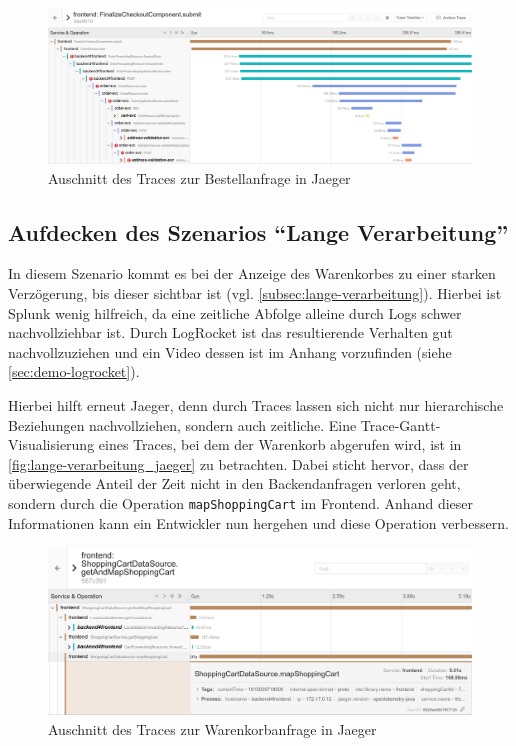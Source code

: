 \begin{figure}[H]
	\centering
	\includegraphics[width=1.00\linewidth]{img/05_ergebnis/ungueltige-adressen-sind-gueltig_jaeger-detail.png}
	\caption{Auschnitt des Traces zur Bestellanfrage in Jaeger}
	\label{fig:ungueltige-adressen-sind-gueltig_jaeger-detail}
\end{figure}

\subsection{Aufdecken des Szenarios \enquote{Lange Verarbeitung}}

In diesem Szenario kommt es bei der Anzeige des Warenkorbes zu einer starken Verzögerung, bis dieser sichtbar ist (vgl. \autoref{subsec:lange-verarbeitung}). Hierbei ist Splunk wenig hilfreich, da eine zeitliche Abfolge alleine durch Logs schwer nachvollziehbar ist. Durch LogRocket ist das resultierende Verhalten gut nachvollzuziehen und ein Video dessen ist im Anhang vorzufinden (siehe \autoref{sec:demo-logrocket}).

Hierbei hilft erneut Jaeger, denn durch Traces lassen sich nicht nur hierarchische Beziehungen nachvollziehen, sondern auch zeitliche. Eine Trace-Gantt-Visualisierung eines Traces, bei dem der Warenkorb abgerufen wird, ist in \autoref{fig:lange-verarbeitung_jaeger} zu betrachten. Dabei sticht hervor, dass der überwiegende Anteil der Zeit nicht in den Backendanfragen verloren geht, sondern durch die Operation \texttt{mapShoppingCart} im Frontend. Anhand dieser Informationen kann ein Entwickler nun hergehen und diese Operation verbessern.

\begin{figure}[H]
	\centering
	\includegraphics[width=1.00\linewidth]{img/05_ergebnis/lange-verarbeitung_jaeger.png}
	\caption{Auschnitt des Traces zur Warenkorbanfrage in Jaeger}
	\label{fig:lange-verarbeitung_jaeger}
\end{figure}
